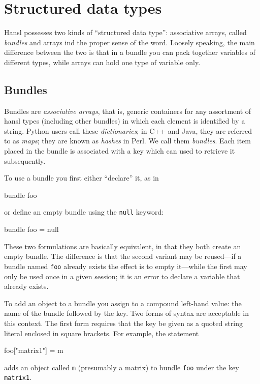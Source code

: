 \chapter{Structured data types}
\label{chap:structypes}

Hansl possesses two kinds of ``structured data type'': associative
arrays, called \emph{bundles} and arrays ind the proper sense of the
word. Loosely speaking, the main difference between the two is that in
a bundle you can pack together variables of different types, while
arrays can hold one type of variable only.

\section{Bundles}
\label{chap:bundles}

Bundles are \emph{associative arrays}, that is, generic containers for
any assortment of hansl types (including other bundles) in which each
element is identified by a string. Python users call these
\emph{dictionaries}; in C++ and Java, they are referred to as
\emph{maps}; they are known as \emph{hashes} in Perl. We call them
\emph{bundles}. Each item placed in the bundle is associated with a
key which can used to retrieve it subsequently.

To use a bundle you first either ``declare'' it, as in
%
\begin{code}
bundle foo
\end{code}
%
or define an empty bundle using the \texttt{null} keyword:
%
\begin{code}
bundle foo = null
\end{code}
%
These two formulations are basically equivalent, in that they both
create an empty bundle. The difference is that the second variant may
be reused---if a bundle named \texttt{foo} already exists the effect
is to empty it---while the first may only be used once in a given
 session; it is an error to declare a variable that already
exists.

To add an object to a bundle you assign to a compound left-hand value:
the name of the bundle followed by the key. Two forms of syntax are
acceptable in this context. The first form requires that the key be
given as a quoted string literal enclosed in square brackets.  For
example, the statement
\begin{code}
foo["matrix1"] = m
\end{code}
adds an object called \texttt{m} (presumably a matrix) to bundle
\texttt{foo} under the key \texttt{matrix1}. 

